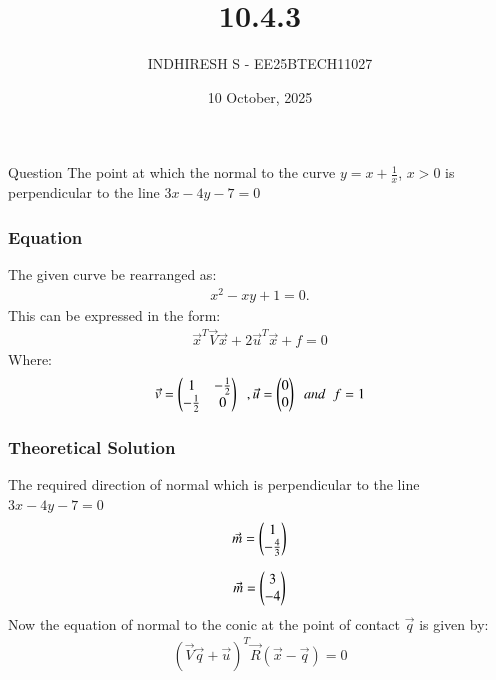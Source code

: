 \documentclass{beamer}
\title %
    {10.4.3}
\date{10 October, 2025}
\author %
    {INDHIRESH S - EE25BTECH11027}
\begin{document}
    
    \frame{\titlepage}
    
    \begin{frame}{Question}
  The point at which the normal to the curve
$y = x +\frac{1}{x}$, $x > 0$ is perpendicular to the line $3x - 4y - 7 = 0$
    \end{frame}
    
    \begin{frame}[allowframebreaks] 
    \frametitle{Equation}
        \centering
        \label{tab:parameters}
  The given curve be rearranged as:
\begin{align}
x^2-xy+1=0.
\end{align}
This can be expressed in the form:
\begin{align}
\Vec{x}^T\Vec{V}\Vec{x}+2\Vec{u}^T\vec{x}+f=0
\end{align}
Where:
\begin{align}
\Vec{v}=\begin{pmatrix}1&-\frac{1}{2}\\-\frac{1}{2}&0\end{pmatrix}\;\;,\Vec{u}=\begin{pmatrix}0\\0\end{pmatrix}\;\;and\;\;f=1
\end{align}

    \end{frame}
    
    \begin{frame}
    \frametitle{Theoretical Solution}
   The required direction of normal which is perpendicular to the line $3x-4y-7=0$
\begin{align}
\Vec{m}=\begin{pmatrix}1\\-\frac{4}{3}\end{pmatrix}
\end{align}

\begin{align}
 \Vec{m}=\begin{pmatrix}3\\-4\end{pmatrix}
\end{align}
Now the equation of normal to the conic at the point of contact $\Vec{q}$ is given by:
\begin{align}
   (\Vec{V}\Vec{q}+\Vec{u})^T\Vec{R}(\Vec{x}-\Vec{q})=0
\end{align}


    \end{frame}
    
\end{document}
